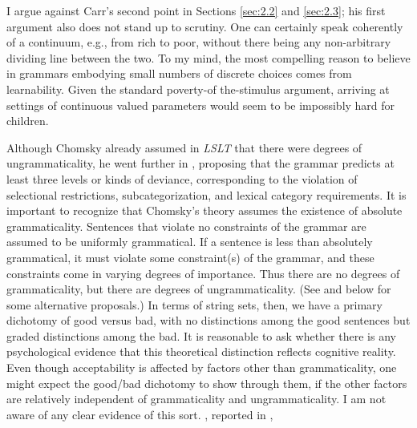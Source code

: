 \indent
I argue against Carr's second point in Sections \ref{sec:2.2} and \ref{sec:2.3};
his first argument also does not stand up to scrutiny. One can certainly speak coherently of a continuum, e.g., from rich to poor, without there being any non-arbitrary dividing line between the two. To my mind, the most compelling reason to believe in grammars embodying small numbers of  discrete  choices  comes  from  learnability.  Given the standard poverty-of the-stimulus argument, arriving at settings of continuous valued parameters would seem to be impossibly hard for children.

Although Chomsky already assumed in \textit{LSLT} that there were degrees of ungrammaticality, he went further in , proposing that the grammar predicts at least three levels or kinds of deviance, corresponding to the violation of selectional restrictions, subcategorization, and lexical category requirements. It is important to recognize that Chomsky's theory assumes the existence of absolute grammaticality. Sentences that violate no constraints of the grammar are assumed to be uniformly grammatical. If a sentence is less than absolutely grammatical, it must violate some constraint(s) of the grammar, and these constraints come in varying degrees of importance. Thus there are no degrees of grammaticality, but there are degrees of ungrammaticality. (See \citet[vol. 3]{Levelt1974} and below for some alternative proposals.) In terms of string sets, then, we have a primary dichotomy of good versus bad, with no distinctions among the good sentences but graded distinctions among the bad. It is reasonable to ask whether there is any psychological evidence that this theoretical distinction reflects cognitive reality. Even though acceptability is affected by factors other than grammaticality, one might expect the good/bad dichotomy to show through
them, if the other factors are relatively independent of grammaticality and ungrammaticality. I am not aware of any clear evidence of this sort. \citet{Ross1979}, reported in , 
